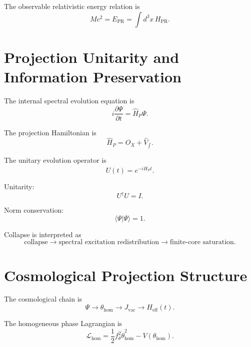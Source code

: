 \documentclass[11pt]{article}
\newcommand{\PR}{\mathrm{PR}}
\newcommand{\eff}{\mathrm{eff}}
\newcommand{\vac}{\mathrm{vac}}
\newcommand{\hom}{\mathrm{hom}}
\begin{document}
The observable relativistic energy relation is
\begin{equation}
\boxed{
Mc^2
=
E_{\PR}
=
\int d^3x\,H_{\PR}.
}
\end{equation}


\section{Projection Unitarity and Information Preservation}

The internal spectral evolution equation is
\begin{equation}
i\frac{\partial\Psi}{\partial t}
=
\hat H_P\Psi.
\end{equation}

The projection Hamiltonian is
\begin{equation}
\hat H_P=O_X+\hat V_{\int}.
\end{equation}

The unitary evolution operator is
\begin{equation}
U(t)=e^{-i\hat H_Pt}.
\end{equation}

Unitarity:
\begin{equation}
\boxed{
U^\dagger U=I.
}
\end{equation}

Norm conservation:
\begin{equation}
\boxed{
\langle\Psi|\Psi\rangle=1.
}
\end{equation}

Collapse is interpreted as
\begin{equation}
\boxed{
\text{collapse}
\rightarrow
\text{spectral excitation redistribution}
\rightarrow
\text{finite-core saturation}.
}
\end{equation}


\section{Cosmological Projection Structure}

The cosmological chain is
\begin{equation}
\boxed{
\Psi
\rightarrow
\theta_{\hom}
\rightarrow
J_{\vac}
\rightarrow
H_{\eff}(t).
}
\end{equation}

The homogeneous phase Lagrangian is
\begin{equation}
\mathcal L_{\hom}
=
\frac12f_\theta^2\dot\theta_{\hom}^2
-
V(\theta_{\hom}).
\end{equation}
\end{document}
